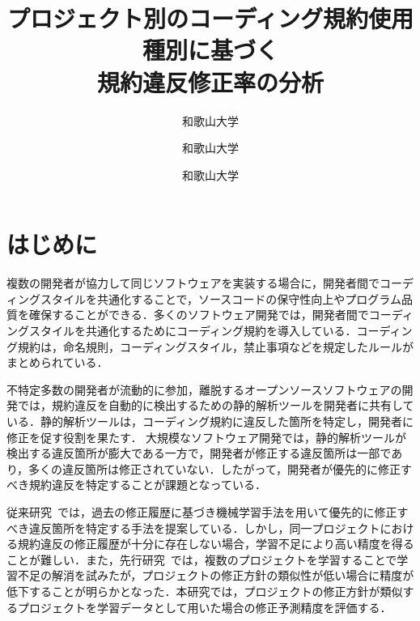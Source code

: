 \documentclass[uplatex,dvipdfmx,a4paper,twocolumn,base=10.5pt,jbase=10.5pt,ja=standard]{bxjsarticle}  %
\title{プロジェクト別のコーディング規約使用種別に基づく\\規約違反修正率の分析}
{Analysis of Coding Convention Violation Rate Between OSS Projects using Similar Coding Rule }
\author{和歌山大学}{野口　朋弥}{Tomoya Noguchi, Wakayama University}
\author{和歌山大学}{伊原　彰紀}{Akinori Ihara, Wakayama University}
\author{和歌山大学}{亀岡　令}{Ryo Kameoka, Wakayama University}
\begin{document}
\maketitle

\section{はじめに}
複数の開発者が協力して同じソフトウェアを実装する場合に，開発者間でコーディングスタイルを共通化することで，ソースコードの保守性向上やプログラム品質を確保することができる．多くのソフトウェア開発では，開発者間でコーディングスタイルを共通化するためにコーディング規約を導入している．コーディング規約は，命名規則，コーディングスタイル，禁止事項などを規定したルールがまとめられている．

不特定多数の開発者が流動的に参加，離脱するオープンソースソフトウェアの開発では，規約違反を自動的に検出するための静的解析ツールを開発者に共有している．静的解析ツールは，コーディング規約に違反した箇所を特定し，開発者に修正を促す役割を果たす．
大規模なソフトウェア開発では，静的解析ツールが検出する違反箇所が膨大である一方で，開発者が修正する違反箇所は一部であり，多くの違反箇所は修正されていない\cite{findBug}．したがって，開発者が優先的に修正すべき規約違反を特定することが課題となっている．

従来研究~\cite{Junjie}では，過去の修正履歴に基づき機械学習手法を用いて優先的に修正すべき違反箇所を特定する手法を提案している．しかし，同一プロジェクトにおける規約違反の修正履歴が十分に存在しない場合，学習不足により高い精度を得ることが難しい．また，先行研究~\cite{kameoka}では，複数のプロジェクトを学習することで学習不足の解消を試みたが，プロジェクトの修正方針の類似性が低い場合に精度が低下することが明らかとなった．本研究では，プロジェクトの修正方針が類似するプロジェクトを学習データとして用いた場合の修正予測精度を評価する．
\end{document}
